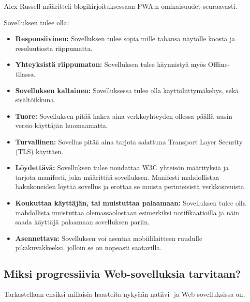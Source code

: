 \documentclass{tktltiki}
\begin{document}
Alex Russell määritteli blogikirjoituksessaan PWA:n ominaisuudet seuraavasti. 

Sovelluksen tulee olla:
\begin{itemize}
  \item \textbf{Responsiivinen:} Sovelluksen tulee sopia mille tahansa näytölle koosta ja resoluutiosta riippumatta.
  \item \textbf{Yhteyksistä riippumaton:} Sovelluksen tulee käynnistyä myös Offline-tilassa.
  \item \textbf{Sovelluksen kaltainen:} Sovelluksessa tulee olla käyttöliittymäkehys, sekä sisältöikkuna.
  \item \textbf{Tuore:} Sovelluksen pitää hakea aina verkkoyhteyden ollessa päällä uusin versio käyttäjän huomaamatta.
  \item \textbf{Turvallinen:} Sovellus pitää aina tarjota salattuna Transport Layer Security (TLS) käyttäen.
  \item \textbf{Löydettävä:} Sovelluksen tulee noudattaa W3C yhteisön määrityksiä ja tarjota manifesti, joka määrittää sovelluksen. Manifesti mahdollistaa hakukoneiden löytää sovellus ja erottaa se muista perinteisistä verkkosivuista.
  \item \textbf{Koukuttaa käyttäjän, tai muistuttaa palaamaan:} Sovelluksen tulee olla mahdollista muistuttaa olemassaolostaan esimerkiksi notifikaatioilla ja näin saada käyttäjä palaamaan sovelluksen pariin.
  \item \textbf{Asennettava:} Sovelluksen voi asentaa mobiililaitteen ruudulle pikakuvakkeeksi, jolloin se on nopeasti saatavilla.
\end{itemize}

\subsection{Miksi progressiivia Web-sovelluksia tarvitaan?}
\enlargethispage{5mm}

Tarkastellaan ensiksi millaisia haasteita nykyään natiivi- ja Web-sovelluksissa on.
\end{document}
